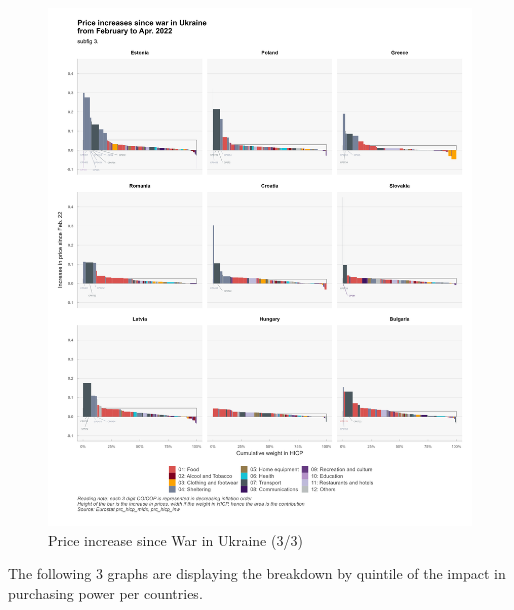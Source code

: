 \documentclass[
  9pt,
  a4paper,
  DIV=11,
  numbers=noendperiod]{scrartcl}
\begin{document}
\begin{figure}

\caption{Price increase since War in Ukraine (3/3)}

{\centering \includegraphics[width=16cm,height=\textheight]{../svg/depuis_wiu_3.png}

}

\end{figure}

The following 3 graphs are displaying the breakdown by quintile of the
impact in purchasing power per countries.
\end{document}
